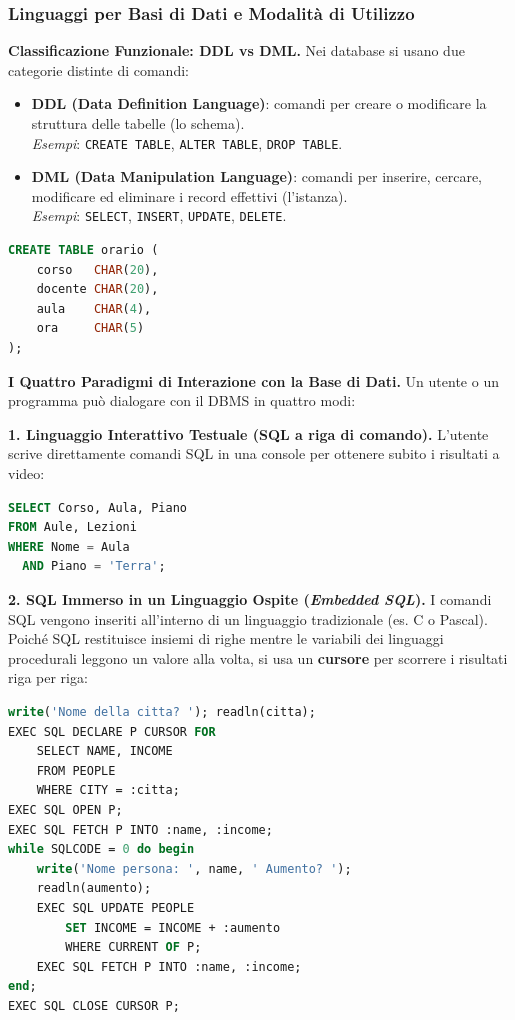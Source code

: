 \documentclass[12pt]{extarticle}
\begin{document}
\subsubsection{Linguaggi per Basi di Dati e Modalità di Utilizzo}
\noindent \textbf{Classificazione Funzionale: DDL vs DML.} Nei database si usano due categorie distinte di comandi:
\begin{itemize}
    \item \textbf{DDL (Data Definition Language)}: comandi per creare o modificare la struttura delle tabelle (lo schema). \\
    \textit{Esempi}: \texttt{CREATE TABLE}, \texttt{ALTER TABLE}, \texttt{DROP TABLE}.
    \item \textbf{DML (Data Manipulation Language)}: comandi per inserire, cercare, modificare ed eliminare i record effettivi (l'istanza). \\
    \textit{Esempi}: \texttt{SELECT}, \texttt{INSERT}, \texttt{UPDATE}, \texttt{DELETE}.
\end{itemize}

\begin{lstlisting}[language=SQL, caption={Esempio DDL: creazione dello schema di una tabella}]
CREATE TABLE orario (
    corso   CHAR(20),
    docente CHAR(20),
    aula    CHAR(4),
    ora     CHAR(5)
);
\end{lstlisting}

\medskip
\noindent \textbf{I Quattro Paradigmi di Interazione con la Base di Dati.} Un utente o un programma può dialogare con il DBMS in quattro modi:

\medskip
\noindent \textbf{1. Linguaggio Interattivo Testuale (SQL a riga di comando).} L'utente scrive direttamente comandi SQL in una console per ottenere subito i risultati a video:

\begin{lstlisting}[language=SQL, caption={Query SQL interattiva}]
SELECT Corso, Aula, Piano
FROM Aule, Lezioni
WHERE Nome = Aula
  AND Piano = 'Terra';
\end{lstlisting}

\noindent \textbf{2. SQL Immerso in un Linguaggio Ospite (\textit{Embedded SQL}).} I comandi SQL vengono inseriti all'interno di un linguaggio tradizionale (es. C o Pascal). Poiché SQL restituisce insiemi di righe mentre le variabili dei linguaggi procedurali leggono un valore alla volta, si usa un \textbf{cursore} per scorrere i risultati riga per riga:

\begin{lstlisting}[language=Pascal, caption={Esempio di Embedded SQL in Pascal con cursore}]
write('Nome della citta? '); readln(citta);
EXEC SQL DECLARE P CURSOR FOR
    SELECT NAME, INCOME
    FROM PEOPLE
    WHERE CITY = :citta;
EXEC SQL OPEN P;
EXEC SQL FETCH P INTO :name, :income;
while SQLCODE = 0 do begin
    write('Nome persona: ', name, ' Aumento? ');
    readln(aumento);
    EXEC SQL UPDATE PEOPLE
        SET INCOME = INCOME + :aumento
        WHERE CURRENT OF P;
    EXEC SQL FETCH P INTO :name, :income;
end;
EXEC SQL CLOSE CURSOR P;
\end{lstlisting}
\end{document}
